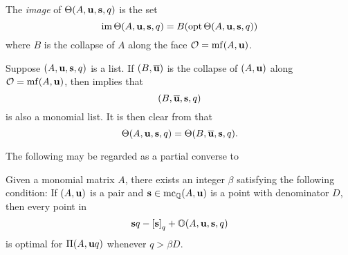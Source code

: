 \documentclass[11pt]{amsart}
\begin{document}
\begin{definition}
The \emph{image} of $\Theta(A, \mathbf{u}, \mathbf{s}, q)$ is the set \[ \operatorname{im} \Theta(A, \mathbf{u}, \mathbf{s}, q)  = B (\operatorname{opt} \Theta(A, \mathbf{u}, \mathbf{s}, q))\] 
where $B$ is the collapse of $A$ along the face $\mathcal{O} = \operatorname{mf}(A, \mathbf{u})$.
\end{definition}

\begin{remark}
\label{collapsed aux program: R}
Suppose $(A, \mathbf{u}, \mathbf{s}, q)$ is a list.  If $(B, \overline{\mathbf{u}})$ is the collapse of $(A ,\mathbf{u})$ along $\mathcal{O} = \operatorname{mf}(A, \mathbf{u})$, then  implies that 
\[ (B, \overline{\mathbf{u}}, \mathbf{s}, q) \] is also a monomial list.  It is then clear from  that 
\[ \Theta(A, \mathbf{u}, \mathbf{s}, q) = \Theta(B, \overline{\mathbf{u}}, \mathbf{s}, q). \] 
\end{remark}



The following may be regarded as a partial converse to 



\begin{proposition}
\label{uniform value: P}
Given a monomial matrix $A$, there exists an integer $\beta$ satisfying the following condition\textup:  If $(A, \mathbf{u})$ is a pair and $\mathbf{s} \in \operatorname{mc}_{\mathbb{Q}}(A, \mathbf{u})$ is a point with denominator $D$, then every point in
\[ \mathbf{s}q - \left[ \mathbf{s} \right]_q + \mathbb{O}(A, \mathbf{u}, \mathbf{s}, q) \] is optimal for $\Pi(A, \mathbf{u}q)$ whenever $q >  \beta D$. 
\end{proposition}
\end{document}
